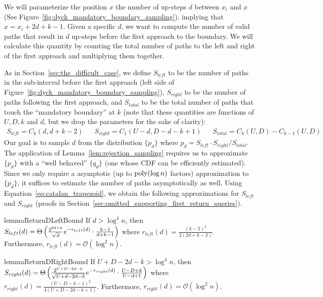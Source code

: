 We will parameterize the position $x$ the number of up-steps $d$ between $x_i$ and $x$ (See Figure~\ref{fig:dyck_mandatory_boundary_sampling}).
implying that $x = x_{i} + 2d + k - 1$.
Given a specific $d$, we want to compute the number of valid paths that result in
$d$ up-steps before the first approach to the boundary.
We will calculate this quantity by counting the total number of paths to the left and right
of the first approach and multiplying them together.

As in Section~\ref{sec:the_difficult_case}, we define
$S_{left}$ to be the number of paths in the sub-interval before the first approach (left side of Figure~\ref{fig:dyck_mandatory_boundary_sampling}),
$S_{right}$ to be the number of paths following the first approach,
and $S_{total}$ to be the total number of paths that touch the ``mandatory boundary'' at $k$
(note that these quantities are functions of $U,D,k$ and $d$, but we drop the parameters for the sake of clarity):
{\small
\begin{align*}
    S_{left} = C_{k}(d, d+k-2)
    &&S_{right} = C_1(U-d, D-d-k+1)
    &&S_{total} = C_k(U,D) - C_{k-1}(U,D)
\end{align*}}
Our goal is to sample $d$ from the distribution $\{ p_d\}$ where $p_d = S_{left}\cdot S_{right}/S_{total}$.
The application of Lemma~\ref{lem:rejection_sampling} requires us to approximate $\{p_d\}$
with a ``well behaved'' $\{q_d\}$ (one whose CDF can be efficiently estimated).
Since we only require a asymptotic (up to $\mathrm{poly}(\log n)$ factors) approximation to $\{p_d\}$,
it suffices to estimate the number of paths asymptotically as well.
Using Equation~\ref{eq:catalan_trapezoid}, we obtain the following approximations for $S_{left}$ and $S_{right}$
(proofs in Section~\ref{sec:omitted_supporting_first_return_queries}).
\begin{restatable}{lemma}{ReturnDLeftBound}
\label{lem:ReturnDLeftBound}
If $d > \log^4 n$, then $S_{left}(d)
= \Theta\left( \frac{2^{2d+k}}{\sqrt{d}}\mathlarger e^{-r_{left}(d)}\cdot \frac{k-1}{d+k-1}\right)$
where $r_{left}(d) = \frac{(k-2)^2}{2(2d+k-2)}$.
Furthermore, $r_{left}(d)=\mathcal O(\log^2 n)$.
\end{restatable}

\begin{restatable}{lemma}{ReturnDRightBound}
\label{lem:ReturnDRightBound}
If $U+D-2d-k > \log^4 n$, then $S_{right}(d)
= \Theta\left( \frac{2^{U+D-2d-k}}{\sqrt{U+d-2d-k}}\mathlarger e^{-r_{right}(d)}\cdot \frac{U-D+k}{U-d+1}\right)$
where $r_{right}(d) = \frac{(U-D-k-1)^2}{4(U+D-2d-k+1)}$.
Furthermore, $r_{right}(d)=\mathcal O(\log^2 n)$.
\end{restatable}

